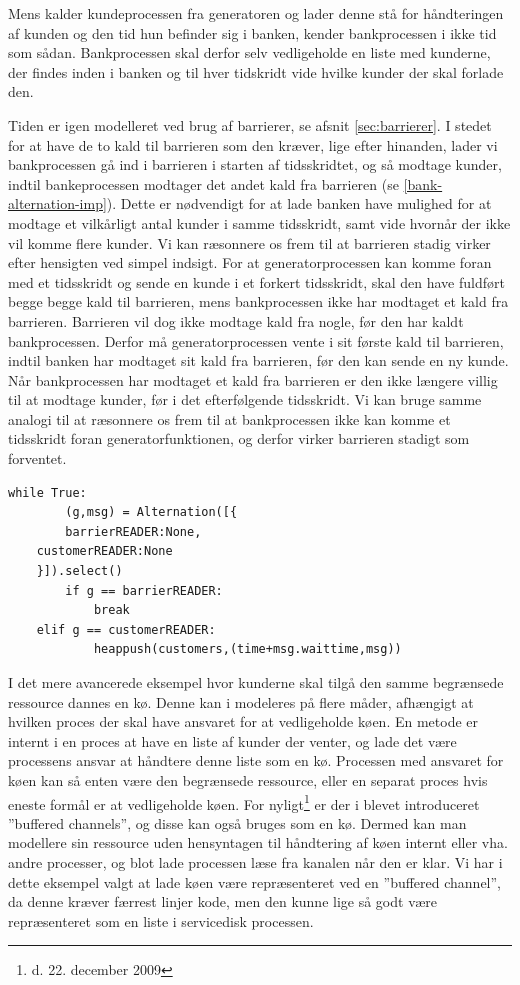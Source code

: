 Mens \simpy kalder kundeprocessen fra generatoren og lader denne stå for håndteringen af kunden 
og den tid hun befinder sig i banken, kender bankprocessen i \pycsp ikke tid som 
sådan. Bankprocessen skal derfor selv vedligeholde en liste med kunderne, der findes inden i banken og til hver 
tidskridt vide hvilke kunder der skal forlade den. 

Tiden er igen modelleret ved brug af barrierer, se afsnit \cref{sec:barrierer}. I 
stedet for at have de to kald til barrieren som den kræver, lige efter hinanden, lader 
vi bankprocessen gå ind i barrieren i starten af tidsskridtet, og så modtage 
kunder, indtil bankeprocessen modtager det andet kald fra barrieren (se 
\cref{bank-alternation-imp}). Dette er nødvendigt for at lade banken have 
mulighed for at modtage et vilkårligt antal kunder i samme tidsskridt, samt 
vide hvornår der ikke vil komme flere kunder.  Vi kan ræsonnere os frem til at 
barrieren stadig virker efter hensigten ved  simpel indsigt.
For at generatorprocessen kan komme foran med et tidsskridt og sende en kunde i et forkert tidsskridt,
skal den have fuldført begge begge kald til barrieren, mens bankprocessen ikke 
har modtaget et kald fra barrieren. Barrieren vil dog ikke modtage kald fra 
nogle, før den har  kaldt bankprocessen. Derfor må generatorprocessen vente i 
sit første kald til barrieren, indtil banken har modtaget sit kald fra 
barrieren, før den kan sende en ny kunde.
Når bankprocessen har modtaget et kald fra barrieren er den ikke længere villig 
til at modtage kunder, før i det efterfølgende tidsskridt. Vi kan bruge samme 
analogi til at ræsonnere os frem til at bankprocessen ikke kan komme et 
tidsskridt foran generatorfunktionen, og derfor virker barrieren stadigt som 
forventet. 

\begin{lstlisting}[float=hbtp,label=bank-alternation-imp,caption=Modtage en 
  kunde eller barrierekald i Bankprocessen]
while True:
		(g,msg) = Alternation([{
		barrierREADER:None,
    customerREADER:None
    }]).select()
		if g == barrierREADER:
			break
    elif g == customerREADER:
			heappush(customers,(time+msg.waittime,msg))
\end{lstlisting}


I det mere avancerede eksempel hvor kunderne skal tilgå den samme begrænsede 
ressource dannes en kø. Denne kan i \pycsp modeleres på flere måder, afhængigt 
at hvilken proces der skal have ansvaret for at vedligeholde køen. En metode er 
internt i en proces at have en liste af kunder der venter, og lade det være 
processens ansvar at håndtere denne liste som en kø. Processen med ansvaret for køen kan 
så enten være den begrænsede ressource, eller en separat proces hvis eneste 
formål er at vedligeholde køen. For nyligt\footnote{d. 22. december 2009} er 
der i \pycsp blevet introduceret ''buffered channels''\cite{pycsp-r147}, og 
disse kan også bruges som en kø. Dermed kan man modellere sin ressource uden 
hensyntagen til håndtering af køen internt eller vha. andre processer, og blot 
lade processen læse fra kanalen når den er klar. Vi har i dette eksempel valgt 
at lade køen være repræsenteret ved en ''buffered channel'', da denne  kræver 
færrest linjer kode, men den kunne lige så godt være repræsenteret som en liste 
i servicedisk processen.


